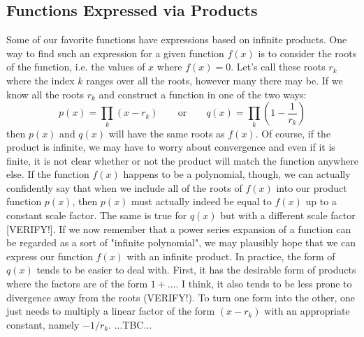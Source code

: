 









\subsection{Functions Expressed via Products}
Some of our favorite functions have expressions based on infinite products. One way to find such an expression for a given function $f(x)$ is to consider the roots of the function, i.e. the values of $x$ where $f(x) = 0$. Let's call these roots $r_k$ where the index $k$ ranges over all the roots, however many there may be. If we know all the roots $r_k$ and construct a function in one of the two ways:
\begin{equation}
 p(x) = \prod_{k} (x - r_k)  \qquad \text{or} \qquad
 q(x) = \prod_{k} (1 - \frac{1}{r_k})
\end{equation}
then $p(x)$ and $q(x)$ will have the same roots as $f(x)$. Of course, if the product is infinite, we may have to worry about convergence and even if it is finite, it is not clear whether or not the product will match the function anywhere else. If the function $f(x)$ happens to be a polynomial, though, we can actually confidently say that when we include all of the roots of $f(x)$ into our product function $p(x)$, then $p(x)$ must actually indeed be equal to $f(x)$ up to a constant scale factor. The same is true for $q(x)$ but with a different scale factor [VERIFY!]. If we now remember that a power series expansion of a function can be regarded as a sort of "infinite polynomial", we may plausibly hope that we can express our function $f(x)$ with an infinite product. In practice, the form of $q(x)$ tends to be easier to deal with. First, it has the desirable form of products where the factors are of the form $1 + \ldots$. I think, it also tends to be less prone to divergence away from the roots (VERIFY!). To turn one form into the other, one just needs to multiply a linear factor of the form $(x - r_k)$ with an appropriate constant, namely $-1 / r_k$. ...TBC...

